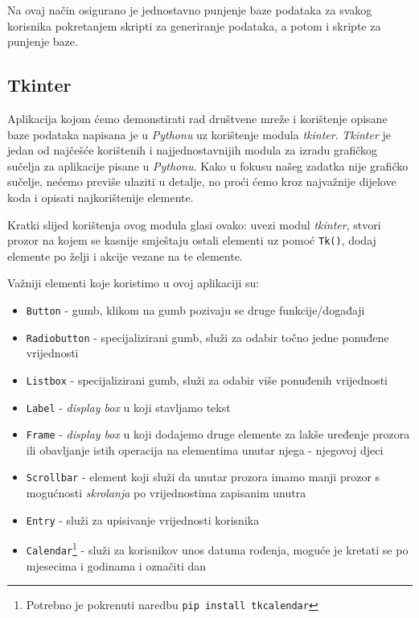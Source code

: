 \documentclass[titlepage, 12pt]{scrartcl}
\begin{document}
	Na ovaj način osigurano je jednostavno punjenje baze podataka za svakog korisnika pokretanjem skripti za generiranje podataka, a potom i skripte za punjenje baze.
	\subsection{Tkinter}
	
	Aplikacija kojom ćemo demonstirati rad društvene mreže i korištenje opisane baze podataka napisana je u \emph{Pythonu} uz korištenje modula \emph{tkinter}. \emph{Tkinter} je jedan od najčešće korištenih i najjednostavnijih modula za izradu grafičkog sučelja za aplikacije pisane u \emph{Pythonu}. Kako u fokusu našeg zadatka nije grafičko sučelje, nećemo previše ulaziti u detalje, no proći ćemo kroz najvažnije dijelove koda i opisati najkorištenije elemente.  
	
	Kratki slijed korištenja ovog modula glasi ovako: uvezi modul \emph{tkinter}, stvori prozor na kojem se kasnije smještaju ostali elementi uz pomoć \texttt{Tk()}, dodaj elemente po želji i akcije vezane na te elemente. 
	
	
	Važniji elementi koje koristimo u ovoj aplikaciji su:
	\begin{itemize}
		\item \texttt{Button} - gumb, klikom na gumb pozivaju se druge funkcije/događaji
		\item \texttt{Radiobutton} - specijalizirani gumb, služi za odabir točno jedne ponuđene vrijednosti
		\item \texttt{Listbox} - specijalizirani gumb, služi za odabir više ponuđenih vrijednosti
		\item \texttt{Label} - \emph{display box} u koji stavljamo tekst
		\item \texttt{Frame} - \emph{display box} u koji dodajemo druge elemente za lakše uređenje prozora ili obavljanje istih operacija na elementima unutar njega - njegovoj djeci
		\item \texttt{Scrollbar} - element koji služi da unutar prozora imamo manji prozor s mogućnosti \emph{skrolanja} po vrijednostima zapisanim unutra
		\item \texttt{Entry} - služi za upisivanje vrijednosti korisnika
		\item \texttt{Calendar}\footnote[1]{Potrebno je pokrenuti naredbu \texttt{pip install tkcalendar}} - služi za korisnikov unos datuma rođenja, moguće je kretati se po mjesecima i godinama i označiti dan
	\end{itemize}
	
\end{document}
